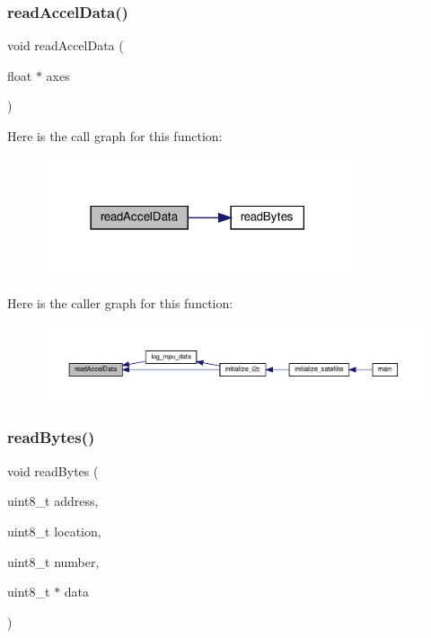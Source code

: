 \subsubsection{\texorpdfstring{read\+Accel\+Data()}{readAccelData()}}
{\footnotesize\ttfamily void read\+Accel\+Data (\begin{DoxyParamCaption}\item[{float $\ast$}]{axes }\end{DoxyParamCaption})}

Here is the call graph for this function\+:
\nopagebreak
\begin{figure}[H]
\begin{center}
\leavevmode
\includegraphics[width=258pt]{i2c-interface_8c_a10fba4cab7c9dfec51afa190dba4c1e9_cgraph}
\end{center}
\end{figure}
Here is the caller graph for this function\+:
\nopagebreak
\begin{figure}[H]
\begin{center}
\leavevmode
\includegraphics[width=350pt]{i2c-interface_8c_a10fba4cab7c9dfec51afa190dba4c1e9_icgraph}
\end{center}
\end{figure}
\mbox{\label{i2c-interface_8c_acc553fa90ebff27c5f1d36e44160c181}} 
\subsubsection{\texorpdfstring{read\+Bytes()}{readBytes()}}
{\footnotesize\ttfamily void read\+Bytes (\begin{DoxyParamCaption}\item[{uint8\+\_\+t}]{address,  }\item[{uint8\+\_\+t}]{location,  }\item[{uint8\+\_\+t}]{number,  }\item[{uint8\+\_\+t $\ast$}]{data }\end{DoxyParamCaption})}

